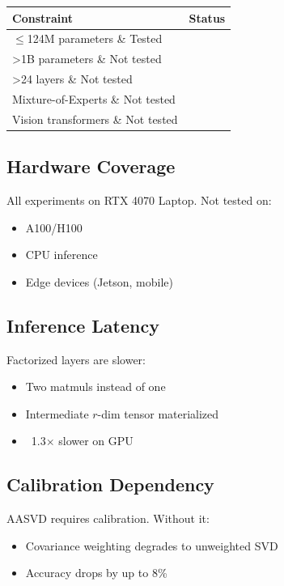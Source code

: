 \begin{table}[H]
\centering
\small
\begin{tabular}{ll}
\toprule
\textbf{Constraint} & \textbf{Status} \\
\midrule
$\le$124M parameters \& Tested \\
>1B parameters \& Not tested \\
>24 layers \& Not tested \\
Mixture-of-Experts \& Not tested \\
Vision transformers \& Not tested \\
\bottomrule
\end{tabular}
\end{table}

\subsection{Hardware Coverage}

All experiments on RTX 4070 Laptop. Not tested on:
\begin{itemize}
\item A100/H100
\item CPU inference
\item Edge devices (Jetson, mobile)

\end{itemize}
\subsection{Inference Latency}

Factorized layers are slower:
\begin{itemize}
\item Two matmuls instead of one
\item Intermediate $r$-dim tensor materialized
\item ~1.3$\times$ slower on GPU

\end{itemize}
\subsection{Calibration Dependency}

AASVD requires calibration. Without it:
\begin{itemize}
\item Covariance weighting degrades to unweighted SVD
\item Accuracy drops by up to 8\%

\end{itemize}
